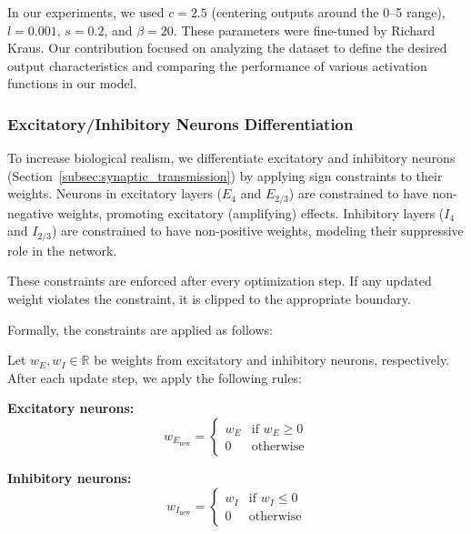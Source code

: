 In our experiments, we used $c = 2.5$ (centering outputs around the 0--5 range), $l = 0.001$, $s = 0.2$, and $\beta = 20$. These parameters were fine-tuned by Richard Kraus. Our contribution focused on analyzing the dataset to define the desired output characteristics and comparing the performance of various activation functions in our model.

\subsubsection{Excitatory/Inhibitory Neurons Differentiation}
\label{subsubsec:exc_inh_differentiation}

To increase biological realism, we differentiate excitatory and inhibitory neurons (Section~\ref{subsec:synaptic_transmission}) by applying sign constraints to their weights. Neurons in excitatory layers ($E_4$ and $E_{2/3}$) are constrained to have non-negative weights, promoting excitatory (amplifying) effects. Inhibitory layers ($I_4$ and $I_{2/3}$) are constrained to have non-positive weights, modeling their suppressive role in the network.

These constraints are enforced after every optimization step. If any updated weight violates the constraint, it is clipped to the appropriate boundary.

Formally, the constraints are applied as follows:

\begin{defn}
    Let $w_E, w_I \in \mathbb{R}$ be weights from excitatory and inhibitory neurons, respectively. After each update step, we apply the following rules:
    
    \textbf{Excitatory neurons:}
    \begin{equation*}
        w_{E_{\text{new}}} =
        \begin{cases}
            w_E & \text{if } w_E \geq 0 \\
            0 & \text{otherwise}
        \end{cases}
    \end{equation*}
    
    \textbf{Inhibitory neurons:}
    \begin{equation*}
        w_{I_{\text{new}}} =
        \begin{cases}
            w_I & \text{if } w_I \leq 0 \\
            0 & \text{otherwise}
        \end{cases}
    \end{equation*}
\end{defn}
\label{def:weight_constraints}


